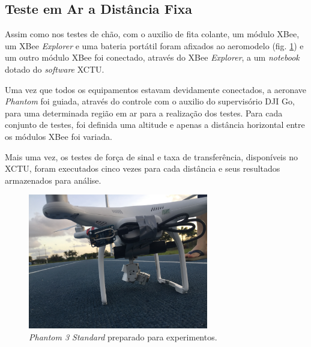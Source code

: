 \subsection{Teste em Ar a Distância Fixa}

Assim como nos testes de chão, com o auxilio de fita colante, um módulo XBee, um XBee \emph{Explorer} e uma bateria portátil foram afixados ao aeromodelo (fig. \ref{fig:conjExp}) e um outro módulo XBee foi conectado, através do XBee \emph{Explorer}, a um \emph{notebook} dotado do \emph{software} XCTU. 

Uma vez que todos os equipamentos estavam devidamente conectados, a aeronave \emph{Phantom} foi guiada, através do controle com o auxilio do supervisório DJI Go, para uma determinada região em ar para a realização dos testes. Para cada conjunto de testes, foi definida uma altitude e apenas a distância horizontal entre os módulos XBee foi variada.

Mais uma vez, os testes de força de sinal e taxa de transferência, disponíveis no XCTU, foram executados cinco vezes para cada distância e seus resultados armazenados para análise. 

\begin{figure} 
\center
\includegraphics[width=0.7\textwidth]{conjExp.jpg}
\caption{\emph{Phantom 3 Standard} preparado para experimentos.} 
\label{fig:conjExp}
\end{figure}
